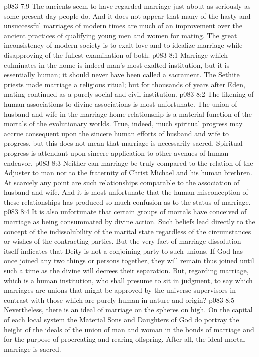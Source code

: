 \vs p083 7:9 \pc The ancients seem to have regarded marriage just about as seriously as some present\hyp{}day people do. And it does not appear that many of the hasty and unsuccessful marriages of modern times are much of an improvement over the ancient practices of qualifying young men and women for mating. The great inconsistency of modern society is to exalt love and to idealize marriage while disapproving of the fullest examination of both.
\vs p083 8:1 Marriage which culminates in the home is indeed man’s most exalted institution, but it is essentially human; it should never have been called a sacrament. The Sethite priests made marriage a religious ritual; but for thousands of years after Eden, mating continued as a purely social and civil institution.
\vs p083 8:2 The likening of human associations to divine associations is most unfortunate. The union of husband and wife in the marriage\hyp{}home relationship is a material function of the mortals of the evolutionary worlds. True, indeed, much spiritual progress may accrue consequent upon the sincere human efforts of husband and wife to progress, but this does not mean that marriage is necessarily sacred. Spiritual progress is attendant upon sincere application to other avenues of human endeavor.
\vs p083 8:3 Neither can marriage be truly compared to the relation of the Adjuster to man nor to the fraternity of Christ Michael and his human brethren. At scarcely any point are such relationships comparable to the association of husband and wife. And it is most unfortunate that the human misconception of these relationships has produced so much confusion as to the status of marriage.
\vs p083 8:4 It is also unfortunate that certain groups of mortals have conceived of marriage as being consummated by divine action. Such beliefs lead directly to the concept of the indissolubility of the marital state regardless of the circumstances or wishes of the contracting parties. But the very fact of marriage dissolution itself indicates that Deity is not a conjoining party to such unions. If God has once joined any two things or persons together, they will remain thus joined until such a time as the divine will decrees their separation. But, regarding marriage, which is a human institution, who shall presume to sit in judgment, to say which marriages are unions that might be approved by the universe supervisors in contrast with those which are purely human in nature and origin?
\vs p083 8:5 Nevertheless, there is an ideal of marriage on the spheres on high. On the capital of each local system the Material Sons and Daughters of God do portray the height of the ideals of the union of man and woman in the bonds of marriage and for the purpose of procreating and rearing offspring. After all, the ideal mortal marriage is  sacred.

